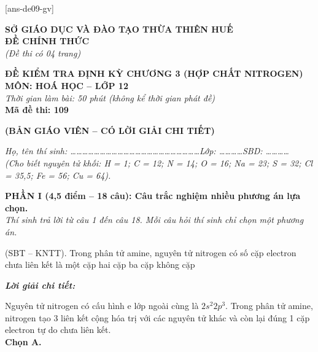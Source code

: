 \documentclass[11pt,a4paper]{article}
\def\loigiai#1{
\par\begingroup\color{blue!80!black}\small
\noindent\textbf{\textit{Lời giải chi tiết:}}\par
#1\par\endgroup}
\begin{document}
[ans-de09-gv]

\noindent
\begin{minipage}[t]{0.48\textwidth}
	\centering
	\textbf{SỞ GIÁO DỤC VÀ ĐÀO TẠO THỪA THIÊN HUẾ}\\
	\textbf{ĐỀ CHÍNH THỨC}\\
	\textit{(Đề thi có 04 trang)}
\end{minipage}\hfill
\begin{minipage}[t]{0.48\textwidth}
	\centering
	\textbf{\color{mainGreen}ĐỀ KIỂM TRA ĐỊNH KỲ CHƯƠNG 3 (HỢP CHẤT NITROGEN)}\\
	\textbf{MÔN: HOÁ HỌC -- LỚP 12}\\
	\textit{Thời gian làm bài: 50 phút (không kể thời gian phát đề)}\\
	\textbf{Mã đề thi: 109}
\end{minipage}


\vspace{0.1cm}
\begin{center}
	\textbf{\color{hfRed}\Large (BẢN GIÁO VIÊN -- CÓ LỜI GIẢI CHI TIẾT)}
\end{center}

\vspace{0.1cm}
\noindent\textit{Họ, tên thí sinh: \dots\dots\dots\dots\dots\dots\dots\dots\dots\dots\dots\dots\dots\dots\dots\dots\dots\dots\dots\dots\dots\dots Lớp: \dots\dots\dots\dots SBD: \dots\dots\dots\dots}\\
\noindent\textit{(Cho biết nguyên tử khối: H = 1; C = 12; N = 14; O = 16; Na = 23; S = 32; Cl = 35,5; Fe = 56; Cu = 64).}

\vspace{0.15cm}
\noindent
\textbf{PHẦN I (4,5 điểm -- 18 câu): Câu trắc nghiệm nhiều phương án lựa chọn.}\\
\textit{Thí sinh trả lời từ câu 1 đến câu 18. Mỗi câu hỏi thí sinh chỉ chọn một phương án.}

\setcounter{ex}{0}

\begin{ex}
(SBT -- KNTT). Trong phân tử amine, nguyên tử nitrogen có số cặp electron chưa liên kết là
\choice
{\True một cặp}
{hai cặp}
{ba cặp}
{không cặp}
\loigiai{
Nguyên tử nitrogen có cấu hình e lớp ngoài cùng là $2s^2 2p^3$. Trong phân tử amine, nitrogen tạo 3 liên kết cộng hóa trị với các nguyên tử khác và còn lại đúng 1 cặp electron tự do chưa liên kết.\\
\textbf{Chọn A.}}
\end{ex}
\end{document}

